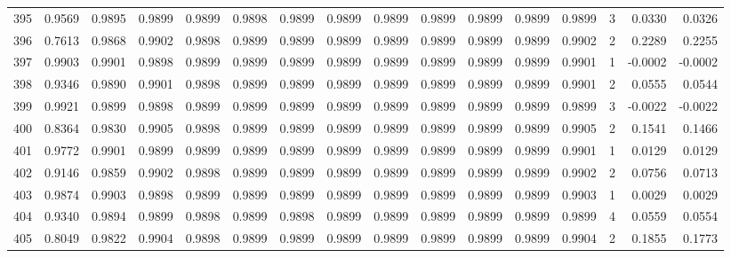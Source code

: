 \begin{tabular}{lrrrrrrrrrrrrrrr}
395 &      0.9569 &  0.9895 &  0.9899 &  0.9899 &  0.9898 &  0.9899 &  0.9899 &  0.9899 &  0.9899 &  0.9899 &   0.9899 &     0.9899 &      3 &                    0.0330 &                     0.0326 \\
396 &      0.7613 &  0.9868 &  0.9902 &  0.9898 &  0.9899 &  0.9899 &  0.9899 &  0.9899 &  0.9899 &  0.9899 &   0.9899 &     0.9902 &      2 &                    0.2289 &                     0.2255 \\
397 &      0.9903 &  0.9901 &  0.9898 &  0.9899 &  0.9899 &  0.9899 &  0.9899 &  0.9899 &  0.9899 &  0.9899 &   0.9899 &     0.9901 &      1 &                   -0.0002 &                    -0.0002 \\
398 &      0.9346 &  0.9890 &  0.9901 &  0.9898 &  0.9899 &  0.9899 &  0.9899 &  0.9899 &  0.9899 &  0.9899 &   0.9899 &     0.9901 &      2 &                    0.0555 &                     0.0544 \\
399 &      0.9921 &  0.9899 &  0.9898 &  0.9899 &  0.9899 &  0.9899 &  0.9899 &  0.9899 &  0.9899 &  0.9899 &   0.9899 &     0.9899 &      3 &                   -0.0022 &                    -0.0022 \\
400 &      0.8364 &  0.9830 &  0.9905 &  0.9898 &  0.9899 &  0.9899 &  0.9899 &  0.9899 &  0.9899 &  0.9899 &   0.9899 &     0.9905 &      2 &                    0.1541 &                     0.1466 \\
401 &      0.9772 &  0.9901 &  0.9899 &  0.9899 &  0.9899 &  0.9899 &  0.9899 &  0.9899 &  0.9899 &  0.9899 &   0.9899 &     0.9901 &      1 &                    0.0129 &                     0.0129 \\
402 &      0.9146 &  0.9859 &  0.9902 &  0.9898 &  0.9899 &  0.9899 &  0.9899 &  0.9899 &  0.9899 &  0.9899 &   0.9899 &     0.9902 &      2 &                    0.0756 &                     0.0713 \\
403 &      0.9874 &  0.9903 &  0.9898 &  0.9899 &  0.9899 &  0.9899 &  0.9899 &  0.9899 &  0.9899 &  0.9899 &   0.9899 &     0.9903 &      1 &                    0.0029 &                     0.0029 \\
404 &      0.9340 &  0.9894 &  0.9899 &  0.9898 &  0.9899 &  0.9898 &  0.9899 &  0.9899 &  0.9899 &  0.9899 &   0.9899 &     0.9899 &      4 &                    0.0559 &                     0.0554 \\
405 &      0.8049 &  0.9822 &  0.9904 &  0.9898 &  0.9899 &  0.9899 &  0.9899 &  0.9899 &  0.9899 &  0.9899 &   0.9899 &     0.9904 &      2 &                    0.1855 &                     0.1773 \\

\end{tabular}
